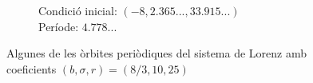 \documentclass[a4paper]{article}
\theoremstyle{definition}
\begin{document}
\begin{figure}[ht]
\begin{subfigure}[b]{0.45\linewidth}
    \caption{Condició inicial: $(-8, 2.365..., 33.915...)$\\ Període: $4.778...$}
  \end{subfigure}
  \caption{Algunes de les òrbites periòdiques del sistema de Lorenz amb coeficients $(b,\sigma, r)=(8/3, 10 , 25)$}
  \label{op3-25}
\end{figure}
\end{document}
